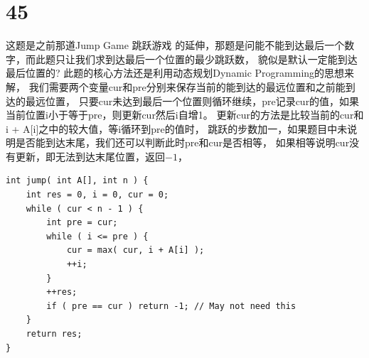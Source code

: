 \documentclass[12pt,a4paper]{article}
\begin{document}
\section{45}
\begin{CJK}{UTF8}{gbsn}
这题是之前那道Jump Game 跳跃游戏 的延伸，那题是问能不能到达最后一个数字，而此题只让我们求到达最后一个位置的最少跳跃数，
貌似是默认一定能到达最后位置的? 此题的核心方法还是利用动态规划Dynamic Programming的思想来解，
我们需要两个变量cur和pre分别来保存当前的能到达的最远位置和之前能到达的最远位置，
只要cur未达到最后一个位置则循环继续，pre记录cur的值，如果当前位置i小于等于pre，则更新cur然后i自增1。
更新cur的方法是比较当前的cur和i + A[i]之中的较大值，等i循环到pre的值时，
跳跃的步数加一，如果题目中未说明是否能到达末尾，我们还可以判断此时pre和cur是否相等，
如果相等说明cur没有更新，即无法到达末尾位置，返回$-1$，
\end{CJK}
\begin{lstlisting}
int jump( int A[], int n ) {
	int res = 0, i = 0, cur = 0;
	while ( cur < n - 1 ) {
		int pre = cur;
		while ( i <= pre ) {
			cur = max( cur, i + A[i] );
			++i;
		}
		++res;
		if ( pre == cur ) return -1; // May not need this
	}
	return res;
}
\end{lstlisting}
\end{document}
